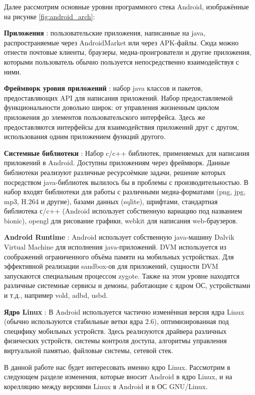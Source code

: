 Далее рассмотрим основные уровни программного стека Android,
изображённые на рисунке \ref{fig:android_arch}:

\textbf{Приложения} : пользовательские приложения, написанные на java,
распространяемые через AndroidMarket или через APK-файлы. Сюда можно
отнести почтовые клиенты, браузеры, медиа-проигрователи и другие
приложения, которыми пользователь обычно пользуется непосредственно
взаимодействуя с ними. 

\textbf{Фреймворк уровня приложений} : набор java классов и пакетов,
предоставляющих API для написания приложений. Набор предоставляемой
функциональности довольно широк: от управления жизненным циклом
приложения до элементов пользовательского интерфейса. Здесь же
предоставляются интерфейсы для взаимодействия приложений друг с другом,
использования одним приложением функций другого.

\textbf{Системные библиотеки} : Набор c/c++ библиотек, применяемых для
написания приложений в Android. Доступны приложениям через фреймворк.
Данные библиотеки реализуют различные ресурсоёмкие задачи, решение
которых посредством java-библиотек вылилось бы в проблемы с
производительностью. В набор входят библиотеки для работы с различными
медиа-форматами (png, jpg, mp3, H.264 и другие), базами данных (sqlite), 
шрифтами, стандартная библиотека с/c++ (Android использует собственную
вариацию под названием bionic), opengl для рисование графики, webkit для
написания web-браузеров. 

\textbf{Android Runtime} : Android использует собственную java-машину
Dalvik Virtual Machine для исполнения java-приложений. DVM используется
из соображений ограниченного объёма памяти на мобильных устройствах. Для
эффективной реализации sandbox-ов для приложений, сущности DVM
запускаются специальным процессом zygote. Также на этом уровне находятся
различные системные сервисы и демоны, работающие с ядром ОС,
устройствами и т.д., например vold, adbd, usbd.

\textbf{Ядро Linux} : В Android используется частично изменённая версия
ядра Linux (обычно используются стабильные ветки ядра 2.6),
оптимизированная под специфику мобильных устройств. Здесь реализуются
драйвера различных физических устройств, системы контроля доступа,
алгоритмы управления виртуальной памятью, файловые системы, сетевой
стек.

В данной работе нас будет интересовать именно ядро Linux. Рассмотрим в
следующем разделе изменения, которые вносит Android в ядро Linux, и на
корелляцию между версиями Linux в Android и в ОС GNU/Linux.


